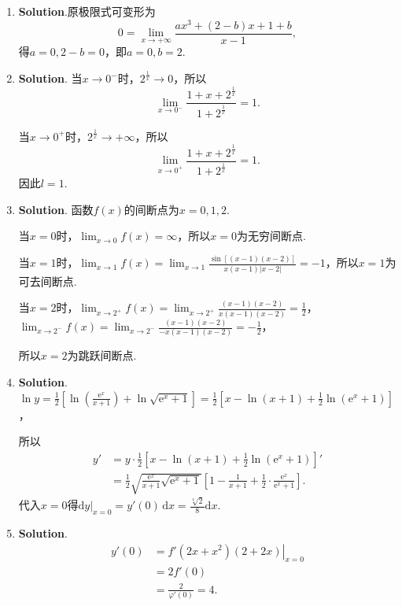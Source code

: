 \documentclass[../main.tex]{subfiles}
\begin{document}
\begin{enumerate}
    \item \textbf{Solution}.原极限式可变形为
          \[
              0=\lim_{x\to+\infty}\frac{ax^{3}+(2-b)x+1+b}{x-1},
          \]
          得$a=0,2-b=0$，即$a=0,b=2$.

    \item \textbf{Solution}. 当$x\to0^{-}$时，$2^{\frac{1}{x}}\to0$，所以
          \[
              \lim_{x\to0^-}\frac{1+x+2^{\frac{1}{x}}}{1+2^{\frac{1}{x}}}=1.
          \]

          当$x\to0^{+}$时，$2^{\frac{1}{x}}\to+\infty$，所以
          \[
              \lim_{x\to0^+}\frac{1+x+2^{\frac{1}{x}}}{1+2^{\frac{1}{x}}}=1.
          \]
          因此$l=1$.

    \item \textbf{Solution}. 函数$f(x)$的间断点为$x=0,1,2$.

          当$x=0$时，$\lim_{x\to0}f(x)=\infty$，所以$x=0$为无穷间断点.

          当$x=1$时，$\lim_{x\to 1}f(x)=\lim_{x\to1}\frac{\sin[(x-1)(x-2)]}{x(x-1)|x-2|}
              =-1$，所以$x=1$为可去间断点.

          当$x=2$时，$\lim_{x\to 2^+}f(x)=\lim_{x\to2^+}\frac{(x-1)(x-2)}{x(x-1)(x-2)}
              =\frac{1}{2}$，$\lim_{x\to 2^-}f(x)=\lim_{x\to2^-}\frac{(x-1)(x-2)}{-x(x-1)(x-2)}
              =-\frac{1}{2}$，

          所以$x=2$为跳跃间断点.

    \item \textbf{Solution}. $\ln y=\frac{1}{2}\left[\ln\left(\frac{\mathrm{e}^{x}}{x+1}
                  \right)+\ln\sqrt{\mathrm{e}^{x}+1}\right]=\frac{1}{2}\left[x-\ln(x+1)+\frac{1}{2}
                  \ln(\mathrm{e}^{x}+1)\right]$，

          所以
          \[
              \begin{aligned}
                  y' & =y\cdot \frac{1}{2}\left[x-\ln(x+1)+\frac{1}{2}\ln(\mathrm{e}^{x}+1)\right]'                                                                      \\
                     & =\frac{1}{2}\sqrt{\frac{\mathrm{e}^x}{x+1}\sqrt{\mathrm{e}^x+1}}\left[1-\frac{1}{x+1}+\frac{1}{2}\cdot\frac{\mathrm{e}^x}{\mathrm{e}^x+1}\right].
              \end{aligned}
          \]
          代入$x=0$得$\left.\mathrm{d}y\right|_{x=0}=y'(0)\,\mathrm{d}x=\frac{\sqrt[4]{2}}{8}
              \mathrm{d}x$.

    \item \textbf{Solution}.
          \[
              \begin{aligned}
                  y'(0) & =\left.f'(2x+x^{2})(2+2x)\right|_{x=0} \\
                        & = 2f'(0)                               \\
                        & = \frac{2}{\varphi'(0)}=4.
              \end{aligned}
          \]


\end{enumerate}
\end{document}
